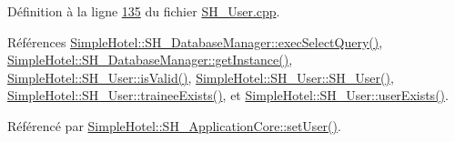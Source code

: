 Définition à la ligne \hyperlink{SH__User_8cpp_source_l00135}{135} du fichier \hyperlink{SH__User_8cpp_source}{S\-H\-\_\-\-User.\-cpp}.



Références \hyperlink{classSimpleHotel_1_1SH__DatabaseManager_ade052bd4f0e6aa490becef78ce4ea4d7}{Simple\-Hotel\-::\-S\-H\-\_\-\-Database\-Manager\-::exec\-Select\-Query()}, \hyperlink{classSimpleHotel_1_1SH__DatabaseManager_a0bcee98b94b5144e4c066000c4ae3321}{Simple\-Hotel\-::\-S\-H\-\_\-\-Database\-Manager\-::get\-Instance()}, \hyperlink{classSimpleHotel_1_1SH__User_a8b60e67bc474ee97367f36d0278721ca}{Simple\-Hotel\-::\-S\-H\-\_\-\-User\-::is\-Valid()}, \hyperlink{classSimpleHotel_1_1SH__User_a17ba6e42386d48d6463cfceb92c1640c}{Simple\-Hotel\-::\-S\-H\-\_\-\-User\-::\-S\-H\-\_\-\-User()}, \hyperlink{classSimpleHotel_1_1SH__User_a502467b4e5fbe99a7bb0b07f4eb1cee0}{Simple\-Hotel\-::\-S\-H\-\_\-\-User\-::trainee\-Exists()}, et \hyperlink{classSimpleHotel_1_1SH__User_ade0c6b106701dd94e78a0cbf116c926d}{Simple\-Hotel\-::\-S\-H\-\_\-\-User\-::user\-Exists()}.



Référencé par \hyperlink{classSimpleHotel_1_1SH__ApplicationCore_a2af3f48e113eaa6771a0fa328bd9f2e1}{Simple\-Hotel\-::\-S\-H\-\_\-\-Application\-Core\-::set\-User()}.


